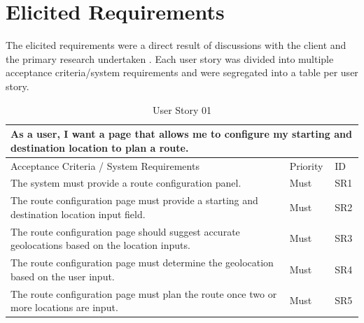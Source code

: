 \clearpage
\section{Elicited Requirements}
\label{requirements:user-stories}

The elicited requirements were a direct result of discussions with the client and the primary research undertaken . Each user story was divided into multiple acceptance criteria/system requirements and were segregated into a table per user story.

\begin{table}[!htb]
\caption{User Story 01}
\label{tab:user-story-01}
\begin{tabular}{ p{8cm} p{1cm}  p{1cm} }
\hline
\multicolumn{3}{p{13cm}}{As a user, I want a page that allows me to configure my starting and destination location to plan a route.}\\ 
\hline
Acceptance Criteria / System Requirements & Priority & ID\\
\hline
The system must provide a route configuration panel. & Must & SR1\\
The route configuration page must provide a starting and destination location input field. & Must & SR2\\
The route configuration page should suggest accurate geolocations based on the location inputs. & Must & SR3\\ 
The route configuration page must determine the geolocation based on the user input. & Must & SR4\\ 
The route configuration page must plan the route once two or more locations are input. & Must & SR5\\ 
\hline
\end{tabular}
\end{table}

